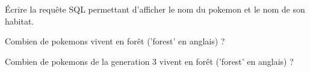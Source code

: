 \question{}
\'Ecrire la requête SQL permettant d'afficher le nom du pokemon et le nom de son habitat.

\question{}
Combien de pokemons vivent en forêt ('forest' en anglais) ?

\question{}
Combien de pokemons de la generation 3 vivent en forêt ('forest' en anglais) ?


%
%
%
%
%
%
%
%
%
%
%
%
%
%
